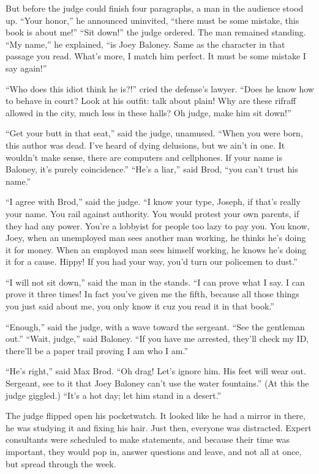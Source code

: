 \documentclass[oneside]{book}
\begin{document}
But before the judge could finish four paragraphs, a man in the audience stood up.
``Your honor,'' he announced uninvited, ``there must be some mistake, this book is
about me!''  ``Sit down!'' the judge ordered.  The man remained standing.  ``My name,''
he explained, ``is Joey Baloney.  Same as the character in that passage you read.
What's more, I match him perfect.  It must be some mistake I say again!''

``Who does this idiot think he is?!'' cried the defense's lawyer.
``Does he know how to behave in court?  Look at his outfit: talk about plain!
Why are these rifraff allowed in the city, much less in these halls?
Oh judge, make him sit down!''

``Get your butt in that seat,'' said the judge, unamused.  ``When you were born,
this author was dead.  I've heard of dying delusions, but we ain't in one.
It wouldn't make sense, there are computers and cellphones.
If your name is Baloney, it's purely coincidence.''   ``He's a liar,'' said Brod,
``you can't trust his name.''

``I agree with Brod,'' said the judge.  ``I know your type, Joseph, if that's really your name.
You rail against authority.  You would protest your own parents, if they had any power.
You're a lobbyist for people too lazy to pay you.
You know, Joey, when an unemployed man sees another man working, he thinks he's doing it
for money.  When an employed man sees himself working, he knows he's doing it for a cause.
Hippy!
If you had your way, you'd turn our policemen to dust.''


``I will not sit down,'' said the man in the stands.  ``I can prove what I say.
I can prove it three times!  In fact you've given me the fifth, because all those
things you just said about me, you only know it cuz you read it in that book.''

``Enough,'' said the judge, with a wave toward the sergeant.
``See the gentleman out.''  ``Wait, judge,'' said Baloney.  ``If you have me
arrested, they'll check my ID, there'll be a paper trail proving I am who I am.''

``He's right,'' said Max Brod.  ``Oh drag!  Let's ignore him.  His feet will
wear out.  Sergeant, see to it that Joey Baloney can't use the water fountains.''
(At this the judge giggled.)  ``It's a hot day; let him stand in a desert.''

The judge flipped open his pocketwatch.  It looked like he had a mirror in there,
he was studying it and fixing his hair.
Just then, everyone was distracted.
Expert consultants were scheduled to make statements, and because their time
was important, they would pop in, answer questions and leave,
and not all at once, but spread through the week.
\end{document}
